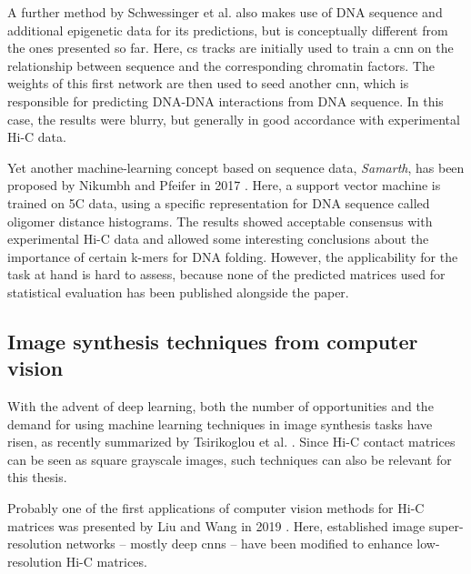 A further method by Schwessinger et al. \cite{Schwessinger2019} also makes use of DNA sequence and additional epigenetic data for its predictions,
but is conceptually different from the ones presented so far.
Here, \acrshort{cs} tracks are initially used to train a \acrshort{cnn} on the relationship between sequence and 
the corresponding chromatin factors. The weights of this first network are then used to seed another \acrlong{cnn},
which is responsible for predicting DNA-DNA interactions from DNA sequence.
In this case, the results were blurry, but generally in good accordance with experimental Hi-C data.

Yet another machine-learning concept based on sequence data, \emph{Samarth}, has been proposed by Nikumbh and Pfeifer in 2017 \cite{Nikumbh2017}.
Here, a support vector machine is trained on 5C data, using a specific representation for DNA sequence called oligomer distance histograms.
The results showed acceptable consensus with experimental Hi-C data and allowed some interesting conclusions
about the importance of certain k-mers for DNA folding. However, the applicability for the task at hand is hard to assess, 
because none of the predicted matrices used for statistical evaluation has been published alongside the paper.


\subsection{Image synthesis techniques from computer vision} \label{sec:prior:generativeCV}
With the advent of deep learning, both the number of opportunities and the demand for using machine learning techniques 
in image synthesis tasks have risen, as recently summarized by Tsirikoglou et al. \cite{Tsirikoglou2020}.
Since Hi-C contact matrices can be seen as square grayscale images, such techniques can also be relevant for this thesis.

Probably one of the first applications of computer vision methods for Hi-C matrices was presented by Liu and Wang in 2019 \cite{Liu2019b}.
Here, established image super-resolution networks -- mostly deep \acrlong{cnn}s -- have been modified to enhance low-resolution Hi-C matrices.

